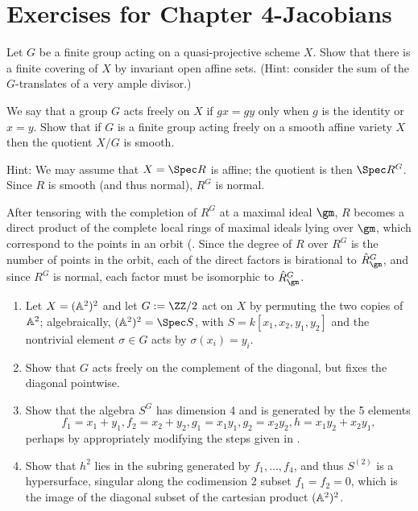 

\chapter{Exercises for Chapter 4-Jacobians}


\begin{exercise}
 Let $G$ be a finite group acting on a quasi-projective scheme $X$. Show that there is a finite covering of $X$ by invariant open affine sets. (Hint: consider the sum of the $G$-translates of a very ample divisor.)
\end{exercise}


\begin{exercise}\label{free actions}
We say that a group $G$ acts freely on $X$ if $gx = gy$ only when $g$ is the identity or $x=y$. Show that
 if $G$ is a finite group acting freely on a smooth affine variety $X$ then the quotient $X/G$ is smooth.
 
 Hint: We may assume that $X = \Spec R$ is affine; the quotient is then $\Spec R^G$. Since $R$ is smooth (and thus normal),
 $R^G$ is normal.
 
  After tensoring with the 
 completion of $R^G$ at a maximal ideal $\gm$, $R$ becomes a direct product of the complete local rings of  
 maximal ideals lying over $\gm$, which correspond to the points in an orbit (\cite[Corollary 7.6 and Proposition 13.10]{Eisenbud1995}.
 Since the degree of $R$ over $R^G$ is the number of points in the orbit, each of the direct factors is birational to $\hat R^G_\gm$,
 and since $R^G$ is normal, each factor must be isomorphic to $\hat R^G_\gm$.
 \end{exercise}


\begin{exercise}
 \label{sym2A2} 
 \begin{enumerate}
 \item Let $X = (\AA^{2})^{2}$ and let $G := \ZZ/2$ act on $X$ by permuting the two copies of  $\AA^{2}$; algebraically,
$(\AA^{2})^{2} = \Spec S$, with $S = k[x_{1},x_{2}, y_{1}, y_{2}]$ and the nontrivial element $\sigma\in G$ acts by
$\sigma(x_{i}) = y_{i}$. 
\item Show that $G$ acts freely on the complement of the diagonal, but fixes the diagonal pointwise.
\item Show that the algebra $S^{G}$ has dimension 4 and is generated by the 5 elements
$$ 
f_{1} = x_{1}+y_{1}, f_{2} = x_{2}+y_{2}, g_{1} = x_{1}y_{1}, g_{2} = x_{2}y_{2}, h = x_{1}y_{2}+x_{2}y_{1},
$$
perhaps by appropriately modifying the steps given in \cite[Exercise 1.6]{Eisenbud1995}. 
\item Show that $h^2$ lies in the subring generated by $f_1,\dots, f_4$, and thus $S^{(2)}$ is a hypersurface, singular
along the  codimension 2 subset $f_{1} = f_{2} = 0$, which is the image of the diagonal subset of the 
cartesian product $(\AA^{2})^{2}$.
\end{enumerate}
\end{exercise}


